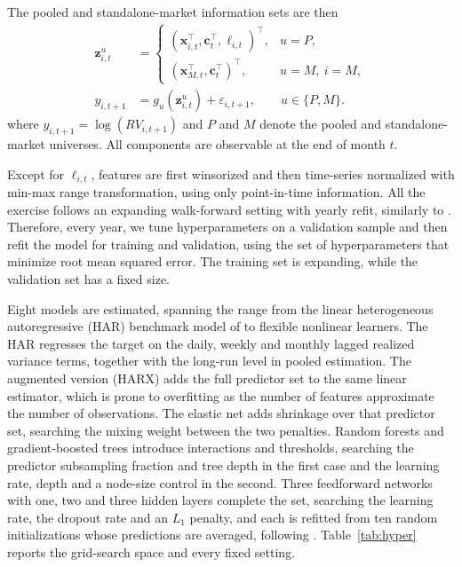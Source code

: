 \documentclass[preprint,12pt,authoryear]{elsarticle}
\begin{document}
The pooled and standalone-market information sets are then
\begin{equation}
\begin{aligned}
\mathbf{z}^{u}_{i,t}&=
  \begin{cases}
  \left(\mathbf{x}_{i,t}^{\top},\mathbf{c}_{t}^{\top},\ell_{i,t}\right)^{\top},
  &u=P,\\
  \left(\mathbf{x}_{M,t}^{\top},\mathbf{c}_{t}^{\top}\right)^{\top},
  &u=M,\ i=M,
  \end{cases}\\
y_{i,t+1}&=g_u\!\left(\mathbf{z}^{u}_{i,t}\right)+\varepsilon_{i,t+1},
\qquad u\in\{P,M\}.
\end{aligned}
\label{eq:model}
\end{equation}
where $y_{i,t+1}=\log(RV_{i,t+1})$ and $P$ and $M$ denote the
pooled and standalone-market universes. All components are observable at the end of month $t$.

Except for $\ell_{i,t}$, features are first winsorized and then time-series normalized with min-max range transformation, using only point-in-time information. All the exercise follows an expanding walk-forward setting with yearly refit, similarly to \citet{gukellyxiu2020}. Therefore, every year, we tune hyperparameters on a validation sample and then refit the model for training and validation, using the set of hyperparameters that minimize root mean squared error. The training set is expanding, while the validation set has a fixed size. 

Eight models are estimated, spanning the range from the linear heterogeneous autoregressive (HAR) benchmark model of \citet{corsi2009} to flexible nonlinear learners. The HAR regresses the target on the daily, weekly and monthly lagged
realized variance terms, together with the long-run level in pooled estimation. The augmented version (HARX) adds the full predictor set to the same linear estimator, which is prone to overfitting as the number of features approximate the number of observations. The elastic net adds shrinkage over that predictor set, searching the mixing weight between the two penalties. Random forests and gradient-boosted trees introduce interactions and thresholds, searching the predictor subsampling fraction and tree depth in the first case and the learning rate, depth and a node-size control in the second. Three feedforward networks with one, two and three hidden layers complete the set, searching the learning rate, the dropout rate and an $L_1$ penalty, and each is refitted from ten random initializations whose predictions are averaged, following \citet{gukellyxiu2020}. Table~\ref{tab:hyper} reports the grid-search space and every fixed setting.
\end{document}
